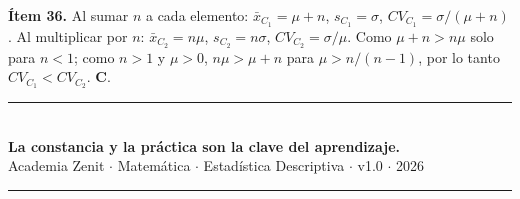 \documentclass[11pt, letterpaper]{article}
\begin{document}
\textbf{\'Item 36.} Al sumar $n$ a cada elemento: $\bar{x}_{C_1}=\mu+n$, $s_{C_1}=\sigma$, $CV_{C_1}=\sigma/(\mu+n)$. Al multiplicar por $n$: $\bar{x}_{C_2}=n\mu$, $s_{C_2}=n\sigma$, $CV_{C_2}=\sigma/\mu$. Como $\mu+n>n\mu$ solo para $n<1$; como $n>1$ y $\mu>0$, $n\mu>\mu+n$ para $\mu>n/(n-1)$, por lo tanto $CV_{C_1}<CV_{C_2}$. \textbf{C}.

\vspace{8pt}
\begin{center}
  \rule{\linewidth}{1.5pt}\\[4pt]
  {\large\bfseries\color{zenitnavy} La constancia y la pr\'actica son la clave del aprendizaje.}\\[2pt]
  {\color{zenitgold}\small Academia Zenit $\cdot$ Matem\'atica $\cdot$ Estad\'istica Descriptiva $\cdot$ v1.0 $\cdot$ 2026}\\[2pt]
  \rule{\linewidth}{1.5pt}
\end{center}
\end{document}
